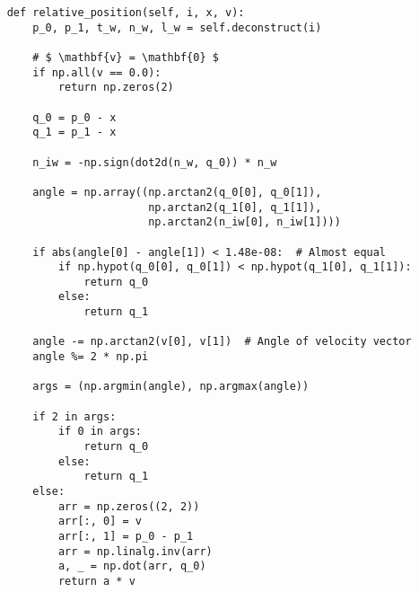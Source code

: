 \begin{verbatim}
    def relative_position(self, i, x, v):
        p_0, p_1, t_w, n_w, l_w = self.deconstruct(i)
        
        # $ \mathbf{v} = \mathbf{0} $
        if np.all(v == 0.0):
            return np.zeros(2)

        q_0 = p_0 - x
        q_1 = p_1 - x

        n_iw = -np.sign(dot2d(n_w, q_0)) * n_w

        angle = np.array((np.arctan2(q_0[0], q_0[1]),
                          np.arctan2(q_1[0], q_1[1]),
                          np.arctan2(n_iw[0], n_iw[1])))

        if abs(angle[0] - angle[1]) < 1.48e-08:  # Almost equal
            if np.hypot(q_0[0], q_0[1]) < np.hypot(q_1[0], q_1[1]):
                return q_0
            else:
                return q_1

        angle -= np.arctan2(v[0], v[1])  # Angle of velocity vector
        angle %= 2 * np.pi

        args = (np.argmin(angle), np.argmax(angle))

        if 2 in args:
            if 0 in args:
                return q_0
            else:
                return q_1
        else:
            arr = np.zeros((2, 2))
            arr[:, 0] = v
            arr[:, 1] = p_0 - p_1
            arr = np.linalg.inv(arr)
            a, _ = np.dot(arr, q_0)
            return a * v
\end{verbatim}
